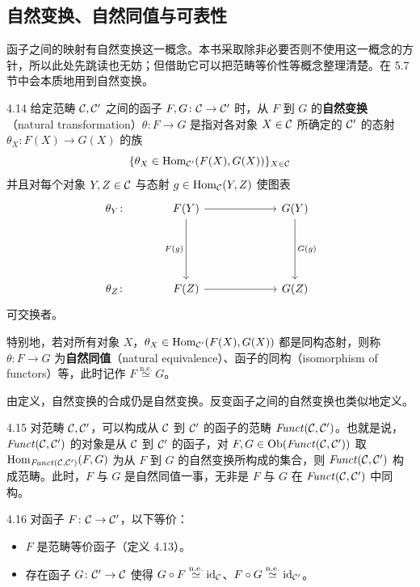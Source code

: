 \subsection{自然变换、自然同值与可表性}

函子之间的映射有自然变换这一概念。本书采取除非必要否则不使用这一概念的方针，所以此处先跳读也无妨；但借助它可以把范畴等价性等概念整理清楚。在 5.7 节中会本质地用到自然变换。

\begin{definition}{4.14}
给定范畴 $\mathcal{C},\mathcal{C}'$ 之间的函子 $F,G\colon\mathcal{C}\to\mathcal{C}'$ 时，从 $F$ 到 $G$ 的\textbf{自然变换}（natural transformation）$\theta\colon F\to G$ 是指对各对象 $X\in\mathcal{C}$ 所确定的 $\mathcal{C}'$ 的态射 $\theta_X\colon F(X)\to G(X)$ 的族
\[ \{\theta_X\in\operatorname{Hom}_{\mathcal{C}'}(F(X),G(X))\}_{X\in\mathcal{C}} \]
并且对每个对象 $Y,Z\in\mathcal{C}$ 与态射 $g\in\operatorname{Hom}_{\mathcal{C}}(Y,Z)$ 使图表
\[
\begin{tikzcd}[row sep=large, column sep=3.2em]
  \theta_Y\colon & F(Y) \arrow[rr] \arrow[dd,"F(g)"'] & & G(Y) \arrow[dd,"G(g)"] \\
  & & & \\
  \theta_Z\colon & F(Z) \arrow[rr] & & G(Z)
\end{tikzcd}
\]
可交换者。

特别地，若对所有对象 $X$，$\theta_X\in\operatorname{Hom}_{\mathcal{C}'}(F(X),G(X))$ 都是同构态射，则称 $\theta\colon F\to G$ 为\textbf{自然同值}（natural equivalence）、函子的同构（isomorphism of functors）等，此时记作 $F\overset{\mathrm{n.e.}}{\simeq}G$。
\end{definition}

由定义，自然变换的合成仍是自然变换。反变函子之间的自然变换也类似地定义。

\begin{remark}{4.15}
对范畴 $\mathcal{C},\mathcal{C}'$，可以构成从 $\mathcal{C}$ 到 $\mathcal{C}'$ 的函子的范畴 $\mathit{Funct}(\mathcal{C},\mathcal{C}')$。也就是说，$\mathit{Funct}(\mathcal{C},\mathcal{C}')$ 的对象是从 $\mathcal{C}$ 到 $\mathcal{C}'$ 的函子，对 $F,G\in\operatorname{Ob}(\mathit{Funct}(\mathcal{C},\mathcal{C}'))$ 取 $\operatorname{Hom}_{\mathit{Funct}(\mathcal{C},\mathcal{C}')}(F,G)$ 为从 $F$ 到 $G$ 的自然变换所构成的集合，则 $\mathit{Funct}(\mathcal{C},\mathcal{C}')$ 构成范畴。此时，$F$ 与 $G$ 是自然同值一事，无非是 $F$ 与 $G$ 在 $\mathit{Funct}(\mathcal{C},\mathcal{C}')$ 中同构。
\end{remark}

\begin{lemma}{4.16}
对函子 $F\colon\mathcal{C}\to\mathcal{C}'$，以下等价：
\begin{itemize}
  \item $F$ 是范畴等价函子（定义 4.13）。
  \item 存在函子 $G\colon\mathcal{C}'\to\mathcal{C}$ 使得 $G\circ F\overset{\mathrm{n.e.}}{\simeq}\mathrm{id}_{\mathcal{C}}$、$F\circ G\overset{\mathrm{n.e.}}{\simeq}\mathrm{id}_{\mathcal{C}'}$。
\end{itemize}
\end{lemma}

